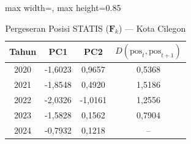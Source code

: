 \begin{table}[H]
\centering
\caption{Pergeseran Posisi STATIS ($\mathbf{F}_k$) --- Kota Cilegon} \label{tab:app2jarak_statis_skor_kota_cilegon}
\begin{adjustbox}{max width=\textwidth, max height=0.85\textheight}
\begin{tabular}{|c|c|c|c|}
\hline
\textbf{Tahun} & \textbf{PC1} & \textbf{PC2} & \textbf{$D(\text{pos}_t, \text{pos}_{t+1})$} \\
\hline
2020 & -1,6023 & 0,9657 & 0,5368 \\
2021 & -1,8548 & 0,4920 & 1,5186 \\
2022 & -2,0326 & -1,0161 & 1,2556 \\
2023 & -1,5828 & 0,1562 & 0,7904 \\
2024 & -0,7932 & 0,1218 & -- \\
\hline
\end{tabular}
\end{adjustbox}
\end{table}